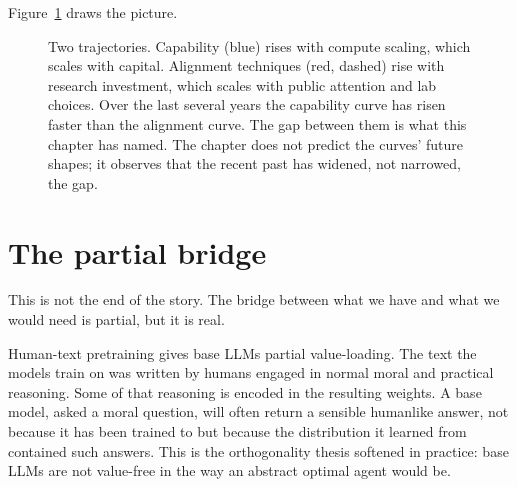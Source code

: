 Figure~\ref{fig:two-trajectories} draws the picture.

\begin{figure}[h]
\centering
{}
\caption{Two trajectories. Capability (blue) rises with compute scaling, which scales with capital. Alignment techniques (red, dashed) rise with research investment, which scales with public attention and lab choices. Over the last several years the capability curve has risen faster than the alignment curve. The gap between them is what this chapter has named. The chapter does not predict the curves' future shapes; it observes that the recent past has widened, not narrowed, the gap.}
\label{fig:two-trajectories}
\end{figure}

\section*{The partial bridge}

This is not the end of the story. The bridge between what we have and what we would need is partial, but it is real.

Human-text pretraining gives base LLMs partial value-loading. The text the models train on was written by humans engaged in normal moral and practical reasoning. Some of that reasoning is encoded in the resulting weights. A base model, asked a moral question, will often return a sensible humanlike answer, not because it has been trained to but because the distribution it learned from contained such answers. This is the orthogonality thesis softened in practice: base LLMs are not value-free in the way an abstract optimal agent would be.

